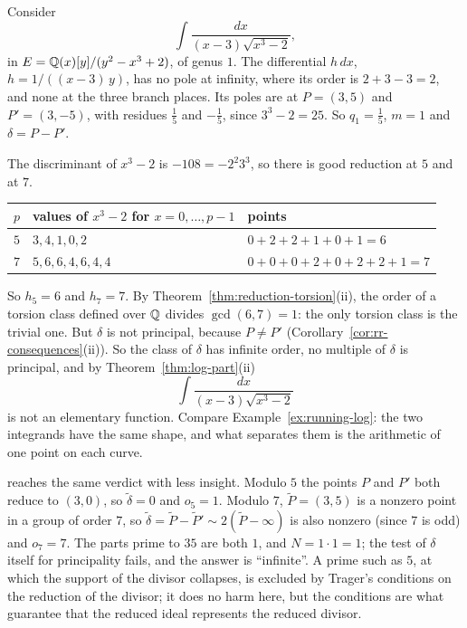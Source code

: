 \begin{example}\label{ex:fo-infinite}
Consider
\[
  \int \frac{dx}{(x - 3) \sqrt{x^3 - 2}} ,
\]
in $E = \mathbb{Q}(x)[y]/(y^2 - x^3 + 2)$, of genus $1$. The differential $h\,dx$,
$h = 1/((x - 3)\,y)$, has no pole at infinity, where its order is $2 + 3 - 3 =
2$, and none at the three branch places. Its poles are at $P = (3, 5)$ and
$P' = (3, -5)$, with residues $\frac15$ and $-\frac15$, since $3^3 - 2 = 25$.
So $q_1 = \frac15$, $m = 1$ and $\delta = P - P'$.

The discriminant of $x^3 - 2$ is $-108 = -2^2 3^3$, so there is good reduction
at $5$ and at $7$.
\begin{center}
\begin{tabular}{@{}lll@{}}
\toprule
$p$ & values of $x^3 - 2$ for $x = 0, \dots, p - 1$ & points \\
\midrule
$5$ & $3, 4, 1, 0, 2$ & $0 + 2 + 2 + 1 + 0 + 1 = 6$ \\
$7$ & $5, 6, 6, 4, 6, 4, 4$ & $0 + 0 + 0 + 2 + 0 + 2 + 2 + 1 = 7$ \\
\bottomrule
\end{tabular}
\end{center}
So $h_5 = 6$ and $h_7 = 7$. By Theorem~\ref{thm:reduction-torsion}(ii), the
order of a torsion class defined over $\mathbb{Q}$ divides $\gcd(6, 7) = 1$: the only
torsion class is the trivial one. But $\delta$ is not principal, because $P
\ne P'$ (Corollary~\ref{cor:rr-consequences}(ii)). So the class of $\delta$
has infinite order, no multiple of $\delta$ is principal, and by
Theorem~\ref{thm:log-part}(ii)
\[
  \int \frac{dx}{(x - 3) \sqrt{x^3 - 2}}
\]
is not an elementary function. Compare Example~\ref{ex:running-log}: the two
integrands have the same shape, and what separates them is the arithmetic of
one point on each curve.

 reaches the same verdict with less insight. Modulo $5$
the points $P$ and $P'$ both reduce to $(3, 0)$, so $\tilde\delta = 0$ and
$o_5 = 1$. Modulo $7$, $\tilde P = (3, 5)$ is a nonzero point in a group of
order $7$, so $\tilde\delta = \tilde P - \tilde P' \sim 2(\tilde P - \infty)$
is also nonzero (since $7$ is odd) and $o_7 = 7$. The parts prime to $35$ are both $1$, and $N = 1
\cdot 1 = 1$; the test of $\delta$ itself for principality fails, and the
answer is ``infinite''. A prime such as $5$, at which the support of the
divisor collapses, is excluded by Trager's conditions on the reduction of the
divisor; it does no harm here, but the conditions are what guarantee that
the reduced ideal represents the reduced divisor.
\end{example}

